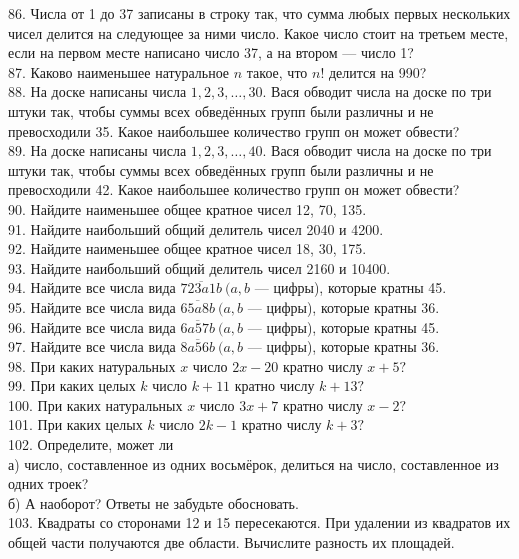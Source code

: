 \documentclass[12pt]{article}
\begin{document}
86. Числа от 1 до 37 записаны в строку так, что сумма любых первых нескольких чисел делится на следующее за ними число. Какое число стоит на третьем месте, если на первом месте написано число 37, а на втором --- число 1?\\
87. Каково наименьшее натуральное $n$ такое, что $n!$ делится на 990?\\
88. На доске написаны числа $1, 2, 3,\ldots, 30.$ Вася обводит числа на доске по три штуки так, чтобы суммы всех обведённых групп были различны и не превосходили 35. Какое наибольшее количество групп он может обвести?\\
89. На доске написаны числа $1, 2, 3,\ldots, 40.$ Вася обводит числа на доске по три штуки так, чтобы суммы всех обведённых групп были различны и не превосходили 42. Какое наибольшее количество групп он может обвести?\\
90. Найдите наименьшее общее кратное чисел 12, 70, 135.\\
91. Найдите наибольший общий делитель чисел 2040 и 4200.\\
92. Найдите наименьшее общее кратное чисел 18, 30, 175.\\
93. Найдите наибольший общий делитель чисел 2160 и 10400.\\
94. Найдите все числа вида $\overline{723a1b}\ (a,b$ --- цифры), которые кратны 45.\\
95. Найдите все числа вида $\overline{65a8b}\ (a,b$ --- цифры), которые кратны 36.\\
96. Найдите все числа вида $\overline{6a57b}\ (a,b$ --- цифры), которые кратны 45.\\
97. Найдите все числа вида $\overline{8a56b}\ (a,b$ --- цифры), которые кратны 36.\\
98. При каких натуральных $x$ число $2x-20$ кратно числу $x+5?$\\
99. При каких целых $k$ число $k+11$ кратно числу $k+13?$\\
100. При каких натуральных $x$ число $3x+7$ кратно числу $x-2?$\\
101. При каких целых $k$ число $2k-1$ кратно числу $k+3?$\\
102. Определите, может ли\\
а) число, составленное из одних восьмёрок, делиться на число, составленное из одних троек?\\
б) А наоборот? Ответы не забудьте обосновать.\\
103. Квадраты со сторонами 12 и 15 пересекаются. При удалении из квадратов их общей части получаются две области. Вычислите разность их площадей.\\
\end{document}
